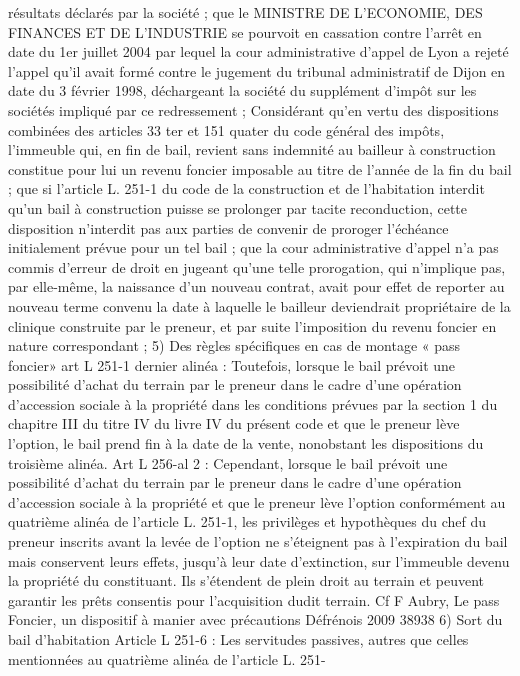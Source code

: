 \documentclass[11pt,a4paper]{report}
\begin{document}
	résultats déclarés par la société ; que le MINISTRE DE L'ECONOMIE, DES FINANCES ET DE L'INDUSTRIE
	se pourvoit en cassation contre l'arrêt en date du 1er juillet 2004 par lequel la cour administrative d'appel de
	Lyon a rejeté l'appel qu'il avait formé contre le jugement du tribunal administratif de Dijon en date du 3 février
	1998, déchargeant la société du supplément d'impôt sur les sociétés impliqué par ce redressement ; Considérant
	qu'en vertu des dispositions combinées des articles 33 ter et 151 quater du code général des impôts, l'immeuble
	qui, en fin de bail, revient sans indemnité au bailleur à construction constitue pour lui un revenu foncier
	imposable au titre de l'année de la fin du bail ; que si l'article L. 251-1 du code de la construction et de
	l'habitation interdit qu'un bail à construction puisse se prolonger par tacite reconduction, cette disposition
	n'interdit pas aux parties de convenir de proroger l'échéance initialement prévue pour un tel bail ; que la cour
	administrative d'appel n'a pas commis d'erreur de droit en jugeant qu'une telle prorogation, qui n'implique pas,
	par elle-même, la naissance d'un nouveau contrat, avait pour effet de reporter au nouveau terme convenu la date
	à laquelle le bailleur deviendrait propriétaire de la clinique construite par le preneur, et par suite l'imposition
	du revenu foncier en nature correspondant ;
	5) Des règles spécifiques en cas de montage « pass foncier»
	art L 251-1 dernier alinéa : Toutefois, lorsque le bail prévoit une possibilité d'achat du terrain par le preneur
	dans le cadre d'une opération d'accession sociale à la propriété dans les conditions prévues par la section 1 du
	chapitre III du titre IV du livre IV du présent code et que le preneur lève l'option, le bail prend fin à la date de la
	vente, nonobstant les dispositions du troisième alinéa.
	Art L 256-al 2 : Cependant, lorsque le bail prévoit une possibilité d'achat du terrain par le preneur dans le
	cadre d'une opération d'accession sociale à la propriété et que le preneur lève l'option conformément au
	quatrième alinéa de l'article L. 251-1, les privilèges et hypothèques du chef du preneur inscrits avant la levée de
	l'option ne s'éteignent pas à l'expiration du bail mais conservent leurs effets, jusqu'à leur date d'extinction, sur
	l'immeuble devenu la propriété du constituant. Ils s'étendent de plein droit au terrain et peuvent garantir les
	prêts consentis pour l'acquisition dudit terrain.
	Cf F Aubry, Le pass Foncier, un dispositif à manier avec précautions Défrénois 2009 38938
	6) Sort du bail d’habitation
	Article L 251-6 : Les servitudes passives, autres que celles mentionnées au quatrième alinéa de l'article L. 251-
\end{document}
